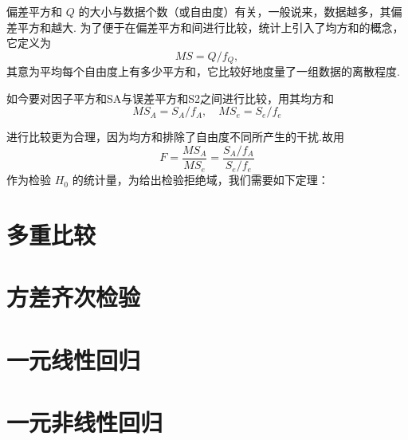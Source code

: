 偏差平方和 $Q$ 的大小与数据个数（或自由度）有关，一般说来，数据越多，其偏差平方和越大. 为了便于在偏差平方和间进行比较，统计上引入了均方和的概念，它定义为 
\begin{equation*}
  MS=Q/f_Q,
\end{equation*}
其意为平均每个自由度上有多少平方和，它比较好地度量了一组数据的离散程度. 

如今要对因子平方和SA与误差平方和S2之间进行比较，用其均方和
\begin{equation*}
  MS_{A}=S_A / f_A, \quad MS_{e}=S_{e}/f_{e}
\end{equation*}


进行比较更为合理，因为均方和排除了自由度不同所产生的干扰.故用
\begin{equation}
  F = \frac{MS_{A}}{MS_{e}} = \frac{S_A/f_A}{S_e/f_e}
\end{equation}
作为检验 $H_0$ 的统计量，为给出检验拒绝域，我们需要如下定理：


\section{多重比较}\label{sec:8.2}

\section{方差齐次检验}\label{sec:8.3}

\section{一元线性回归}\label{sec:8.4}

\section{一元非线性回归}\label{sec:8.5}